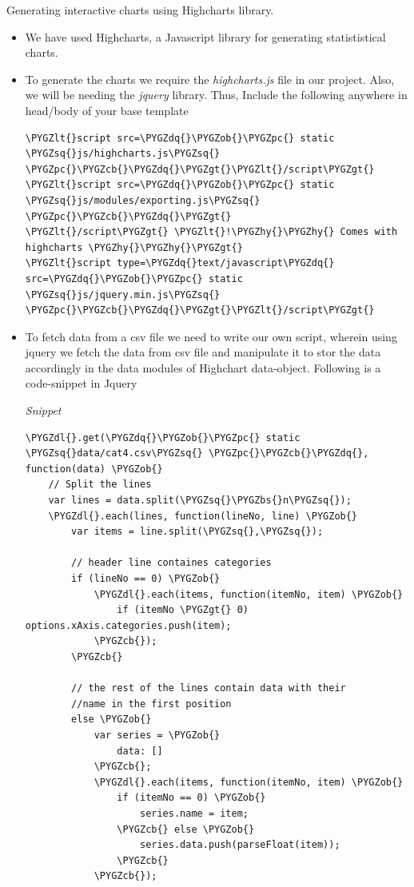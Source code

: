 \documentclass[a4paper,12pt,oneside]{sphinxmanual}
\def\PYGZbs{\char`\\}
\def\PYGZob{\char`\{}
\def\PYGZcb{\char`\}}
\def\PYGZlt{\char`\<}
\def\PYGZgt{\char`\>}
\def\PYGZpc{\char`\%}
\def\PYGZdl{\char`\$}
\def\PYGZhy{\char`\-}
\def\PYGZsq{\char`\'}
\def\PYGZdq{\char`\"}
\begin{document}
Generating interactive charts using Highcharts library.
\begin{itemize}
\item {} 
We have used Highcharts, a Javascript library for generating statististical charts.

\item {} 
To generate the charts we require the \emph{highcharts.js} file in our project. Also, we will be needing the \emph{jquery} library.
Thus, Include the following anywhere in head/body of your base template

\begin{Verbatim}[commandchars=\\\{\}]
\PYGZlt{}script src=\PYGZdq{}\PYGZob{}\PYGZpc{} static \PYGZsq{}js/highcharts.js\PYGZsq{} \PYGZpc{}\PYGZcb{}\PYGZdq{}\PYGZgt{}\PYGZlt{}/script\PYGZgt{}
\PYGZlt{}script src=\PYGZdq{}\PYGZob{}\PYGZpc{} static \PYGZsq{}js/modules/exporting.js\PYGZsq{} \PYGZpc{}\PYGZcb{}\PYGZdq{}\PYGZgt{}
\PYGZlt{}/script\PYGZgt{} \PYGZlt{}!\PYGZhy{}\PYGZhy{} Comes with highcharts \PYGZhy{}\PYGZhy{}\PYGZgt{}
\PYGZlt{}script type=\PYGZdq{}text/javascript\PYGZdq{}
src=\PYGZdq{}\PYGZob{}\PYGZpc{} static \PYGZsq{}js/jquery.min.js\PYGZsq{} \PYGZpc{}\PYGZcb{}\PYGZdq{}\PYGZgt{}\PYGZlt{}/script\PYGZgt{}
\end{Verbatim}

\item {} 
To fetch data from a csv file we need to write our own script, wherein using jquery we fetch the data from csv file and manipulate it to stor the data
accordingly in the data modules of Highchart data-object.
Following is a code-snippet in Jquery

\emph{Snippet}

\begin{Verbatim}[commandchars=\\\{\}]
\PYGZdl{}.get(\PYGZdq{}\PYGZob{}\PYGZpc{} static \PYGZsq{}data/cat4.csv\PYGZsq{} \PYGZpc{}\PYGZcb{}\PYGZdq{}, function(data) \PYGZob{}
    // Split the lines
    var lines = data.split(\PYGZsq{}\PYGZbs{}n\PYGZsq{});
    \PYGZdl{}.each(lines, function(lineNo, line) \PYGZob{}
        var items = line.split(\PYGZsq{},\PYGZsq{});

        // header line containes categories
        if (lineNo == 0) \PYGZob{}
            \PYGZdl{}.each(items, function(itemNo, item) \PYGZob{}
                if (itemNo \PYGZgt{} 0) options.xAxis.categories.push(item);
            \PYGZcb{});
        \PYGZcb{}

        // the rest of the lines contain data with their
        //name in the first position
        else \PYGZob{}
            var series = \PYGZob{}
                data: []
            \PYGZcb{};
            \PYGZdl{}.each(items, function(itemNo, item) \PYGZob{}
                if (itemNo == 0) \PYGZob{}
                    series.name = item;
                \PYGZcb{} else \PYGZob{}
                    series.data.push(parseFloat(item));
                \PYGZcb{}
            \PYGZcb{});


\end{Verbatim}
\end{itemize}
\end{document}
